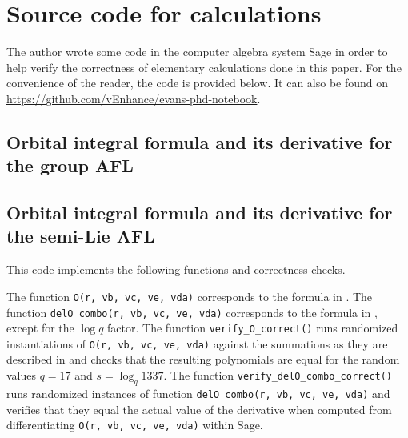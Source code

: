 \chapter{Source code for calculations}
The author wrote some code in the computer algebra system Sage
in order to help verify the correctness of elementary calculations done in this paper.
For the convenience of the reader, the code is provided below.
It can also be found on \url{https://github.com/vEnhance/evans-phd-notebook}.

\section{Orbital integral formula and its derivative for the group AFL}

\section{Orbital integral formula and its derivative for the semi-Lie AFL}
This code implements the following functions and correctness checks.
\begin{itemize}
  \ii The function \texttt{O(r, vb, vc, ve, vda)}
  corresponds to the formula in .
  \ii The function \texttt{delO\_combo(r, vb, vc, ve, vda)}
  corresponds to the formula in ,
  except for the $\log q$ factor.
  \ii The function \texttt{verify\_O\_correct()}
  runs randomized instantiations of \texttt{O(r, vb, vc, ve, vda)}
  against the summations as they are described in 
  and checks that the resulting polynomials are equal for the random values
  $q = 17$ and $s = \log_q 1337$.
  \ii The function \texttt{verify\_delO\_combo\_correct()}
  runs randomized instances of
  function \texttt{delO\_combo(r, vb, vc, ve, vda)}
  and verifies that they equal the actual value of the derivative
  when computed from differentiating \texttt{O(r, vb, vc, ve, vda)} within Sage.
\end{itemize}


